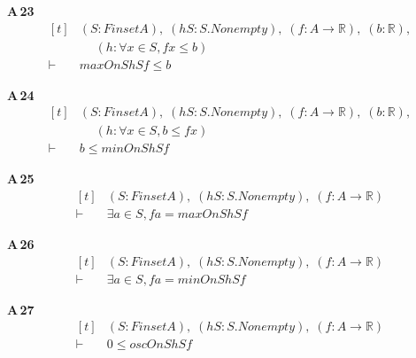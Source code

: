 \noindent\textbf{A\,23}\quad{}
{\footnotesize\[ \begin{aligned}[t]
&(\mathit{S} : \mathit{Finset} \mathit{A}),\; (\mathit{hS} : \mathit{S}.\mathit{Nonempty}),\; (\mathit{f} : \mathit{A} \to \mathbb{R} ),\; (\mathit{b} : \mathbb{R} ),\\
&\quad \; (\mathit{h} : \forall \mathit{x} \in \mathit{S}, \mathit{f} \mathit{x} \leq \mathit{b})\\
\vdash\;&\mathit{maxOn} \mathit{S} \mathit{hS} \mathit{f} \leq \mathit{b}
\end{aligned} \]}

\noindent\textbf{A\,24}\quad{}
{\footnotesize\[ \begin{aligned}[t]
&(\mathit{S} : \mathit{Finset} \mathit{A}),\; (\mathit{hS} : \mathit{S}.\mathit{Nonempty}),\; (\mathit{f} : \mathit{A} \to \mathbb{R} ),\; (\mathit{b} : \mathbb{R} ),\\
&\quad \; (\mathit{h} : \forall \mathit{x} \in \mathit{S}, \mathit{b} \leq \mathit{f} \mathit{x})\\
\vdash\;&\mathit{b} \leq \mathit{minOn} \mathit{S} \mathit{hS} \mathit{f}
\end{aligned} \]}

\noindent\textbf{A\,25}\quad{}
{\footnotesize\[ \begin{aligned}[t]
&(\mathit{S} : \mathit{Finset} \mathit{A}),\; (\mathit{hS} : \mathit{S}.\mathit{Nonempty}),\; (\mathit{f} : \mathit{A} \to \mathbb{R} )\\
\vdash\;&\exists \mathit{a} \in \mathit{S}, \mathit{f} \mathit{a} = \mathit{maxOn} \mathit{S} \mathit{hS} \mathit{f}
\end{aligned} \]}

\noindent\textbf{A\,26}\quad{}
{\footnotesize\[ \begin{aligned}[t]
&(\mathit{S} : \mathit{Finset} \mathit{A}),\; (\mathit{hS} : \mathit{S}.\mathit{Nonempty}),\; (\mathit{f} : \mathit{A} \to \mathbb{R} )\\
\vdash\;&\exists \mathit{a} \in \mathit{S}, \mathit{f} \mathit{a} = \mathit{minOn} \mathit{S} \mathit{hS} \mathit{f}
\end{aligned} \]}

\noindent\textbf{A\,27}\quad{}
{\footnotesize\[ \begin{aligned}[t]
&(\mathit{S} : \mathit{Finset} \mathit{A}),\; (\mathit{hS} : \mathit{S}.\mathit{Nonempty}),\; (\mathit{f} : \mathit{A} \to \mathbb{R} )\\
\vdash\;&0 \leq \mathit{oscOn} \mathit{S} \mathit{hS} \mathit{f}
\end{aligned} \]}

